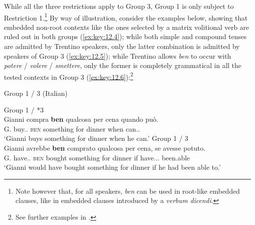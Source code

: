 \documentclass[output=paper]{langsci/langscibook}
\begin{document}
While all the three restrictions apply to Group 3, Group 1 is only subject to
Restriction 1.\footnote{Note however that, for all speakers, \emph{ben} can be
used in root-like embedded clauses, like in embedded clauses introduced by a
\emph{verbum dicendi}.}  By way of illustration, consider the examples below,
showing that embedded non-root contexts like the ones selected by a matrix
volitional verb are ruled out in both groups (\ref{ex:key:12.4}); while both simple and
compound tenses are admitted by Trentino speakers, only the latter combination
is admitted by speakers of Group 3 (\ref{ex:key:12.5}); while Trentino allows \emph{ben} to
occur with \emph{potere} / \emph{volere} / \emph{smettere}, only the former is
completely grammatical in all the tested contexts in Group 3 (\ref{ex:key:12.6}):\footnote{See
further examples in \textcite{CognSchi2018b,CognSchi2018}.}\largerpage[2]

\ea\label{ex:key:12.4} Group 1 / 3 (Italian)\\
	\label{ex:key:12.4a}
	\label{ex:key:12.4b}
	\z
\z

\ea\label{ex:key:12.5} 
	\ea\label{ex:key:12.5a} Group 1 / *3\\
        \sn
		\gll    Gianni compra \textbf{ben} qualcosa per cena quando può.\\
			    G. buy.\Prs.\Tsg{} \textsc{ben} something for dinner when can.\Prs.\Tsg{}\\
		\glt    \enquote*{Gianni buys something for dinner when he can.}
	\ex\label{ex:key:12.5b} Group 1 / 3\\
        \sn
		\gll    Gianni avrebbe \textbf{ben} comprato qualcosa per cena, se
        avesse potuto.\\
			    G. have.\Cond{}.\Tsg{} \textsc{ben} bought something for dinner if have.\Sbjv.\Ipfv.\Tsg{} been.able\\
		\glt    \enquote*{Gianni would have bought something for dinner if he had been able to.}
	\z
\z
\end{document}
